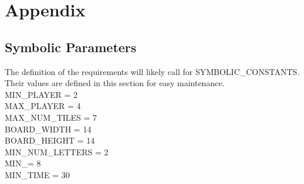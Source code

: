 \documentclass[12pt, titlepage]{article}
\begin{document}
\newpage





\newpage

\section{Appendix}

\subsection{Symbolic Parameters}

The definition of the requirements will likely call for SYMBOLIC\_CONSTANTS.
Their values are defined in this section for easy maintenance. \\
MIN\_PLAYER = 2 \\
MAX\_PLAYER = 4 \\
MAX\_NUM\_TILES =  7 \\
BOARD\_WIDTH = 14 \\
BOARD\_HEIGHT = 14 \\
MIN\_NUM\_LETTERS = 2 \\
MIN\_\AGE = 8 \\
MIN\_TIME = 30 
\end{document}
